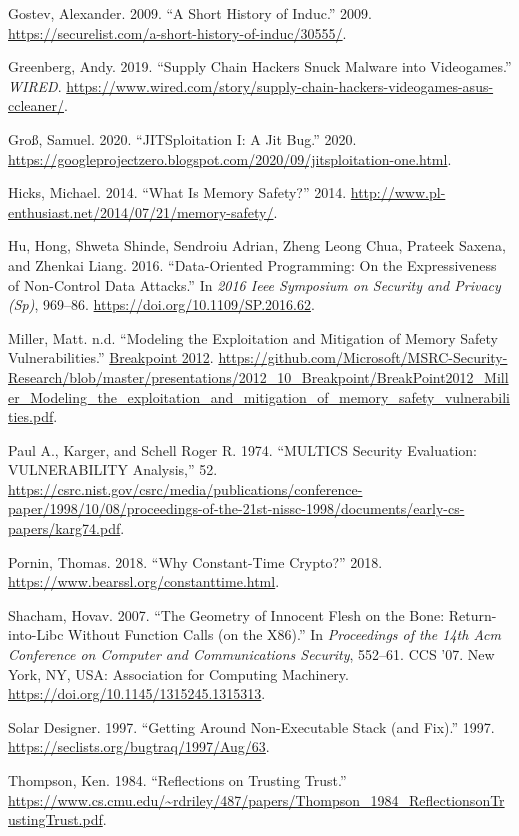 \documentclass[a4paper,]{report}
\begin{document}
\leavevmode\hypertarget{ref-Gostev2009}{}%
Gostev, Alexander. 2009. ``A Short History of Induc.'' 2009.
\url{https://securelist.com/a-short-history-of-induc/30555/}.

\leavevmode\hypertarget{ref-Greenberg2019}{}%
Greenberg, Andy. 2019. ``Supply Chain Hackers Snuck Malware into
Videogames.'' \emph{WIRED}.
\url{https://www.wired.com/story/supply-chain-hackers-videogames-asus-ccleaner/}.

\leavevmode\hypertarget{ref-Grouxdf2020}{}%
Groß, Samuel. 2020. ``JITSploitation I: A Jit Bug.'' 2020.
\url{https://googleprojectzero.blogspot.com/2020/09/jitsploitation-one.html}.

\leavevmode\hypertarget{ref-Hicks2014}{}%
Hicks, Michael. 2014. ``What Is Memory Safety?'' 2014.
\url{http://www.pl-enthusiast.net/2014/07/21/memory-safety/}.

\leavevmode\hypertarget{ref-Hu2016}{}%
Hu, Hong, Shweta Shinde, Sendroiu Adrian, Zheng Leong Chua, Prateek
Saxena, and Zhenkai Liang. 2016. ``Data-Oriented Programming: On the
Expressiveness of Non-Control Data Attacks.'' In \emph{2016 Ieee
Symposium on Security and Privacy (Sp)}, 969--86.
\url{https://doi.org/10.1109/SP.2016.62}.

\leavevmode\hypertarget{ref-Miller2012}{}%
Miller, Matt. n.d. ``Modeling the Exploitation and Mitigation of Memory
Safety Vulnerabilities.''
\href{https://2012.ruxconbreakpoint.com/}{Breakpoint 2012}.
\url{https://github.com/Microsoft/MSRC-Security-Research/blob/master/presentations/2012_10_Breakpoint/BreakPoint2012_Miller_Modeling_the_exploitation_and_mitigation_of_memory_safety_vulnerabilities.pdf}.

\leavevmode\hypertarget{ref-Karger1974}{}%
Paul A., Karger, and Schell Roger R. 1974. ``MULTICS Security
Evaluation: VULNERABILITY Analysis,'' 52.
\url{https://csrc.nist.gov/csrc/media/publications/conference-paper/1998/10/08/proceedings-of-the-21st-nissc-1998/documents/early-cs-papers/karg74.pdf}.

\leavevmode\hypertarget{ref-Pornin2018}{}%
Pornin, Thomas. 2018. ``Why Constant-Time Crypto?'' 2018.
\url{https://www.bearssl.org/constanttime.html}.

\leavevmode\hypertarget{ref-Shacham2007}{}%
Shacham, Hovav. 2007. ``The Geometry of Innocent Flesh on the Bone:
Return-into-Libc Without Function Calls (on the X86).'' In
\emph{Proceedings of the 14th Acm Conference on Computer and
Communications Security}, 552--61. CCS '07. New York, NY, USA:
Association for Computing Machinery.
\url{https://doi.org/10.1145/1315245.1315313}.

\leavevmode\hypertarget{ref-Solar1997}{}%
Solar Designer. 1997. ``Getting Around Non-Executable Stack (and Fix).''
1997. \url{https://seclists.org/bugtraq/1997/Aug/63}.

\leavevmode\hypertarget{ref-Thompson1984}{}%
Thompson, Ken. 1984. ``Reflections on Trusting Trust.''
\url{https://www.cs.cmu.edu/~rdriley/487/papers/Thompson_1984_ReflectionsonTrustingTrust.pdf}.
\end{document}
